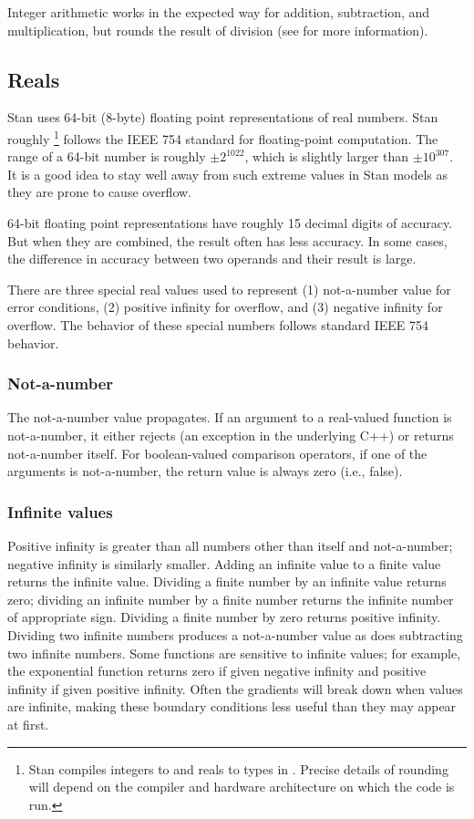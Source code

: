 Integer arithmetic works in the expected way for addition,
subtraction, and multiplication, but rounds the result of division
(see  for more information).

\subsection{Reals}

Stan uses 64-bit (8-byte) floating point representations of real
numbers.  Stan roughly%
%
\footnote{Stan compiles integers to  and reals to
   types in \Cpp.  Precise details of rounding will depend
  on the compiler and hardware architecture on which the code is run.}
%
follows the IEEE 754 standard for floating-point computation.
The range of a 64-bit number is roughly $\pm 2^{1022}$, which is
slightly larger than $\pm 10^{307}$.  It is a good idea to stay well
away from such extreme values in Stan models as they are prone to
cause overflow.

64-bit floating point representations have roughly 15 decimal digits
of accuracy.  But when they are combined, the result often has less
accuracy.  In some cases, the difference in accuracy between two
operands and their result is large.

There are three special real values used to represent (1) not-a-number
value for error conditions, (2) positive infinity for overflow, and
(3) negative infinity for overflow.  The behavior of these special
numbers follows standard IEEE 754 behavior.  

\subsubsection{Not-a-number}

The not-a-number value propagates.  If an argument to a real-valued
function is not-a-number, it either rejects (an exception in the
underlying C++) or returns not-a-number itself.  For boolean-valued
comparison operators, if one of the arguments is not-a-number, the
return value is always zero (i.e., false).

\subsubsection{Infinite values}

Positive infinity is greater than all numbers other than itself and
not-a-number; negative infinity is similarly smaller.  Adding an
infinite value to a finite value returns the infinite value.  Dividing
a finite number by an infinite value returns zero; dividing an
infinite number by a finite number returns the infinite number of
appropriate sign.  Dividing a finite number by zero returns positive
infinity. Dividing two infinite numbers produces a not-a-number value
as does subtracting two infinite numbers.  Some functions are
sensitive to infinite values; for example, the exponential function
returns zero if given negative infinity and positive infinity if given
positive infinity.  Often the gradients will break down when values
are infinite, making these boundary conditions less useful than they
may appear at first.



